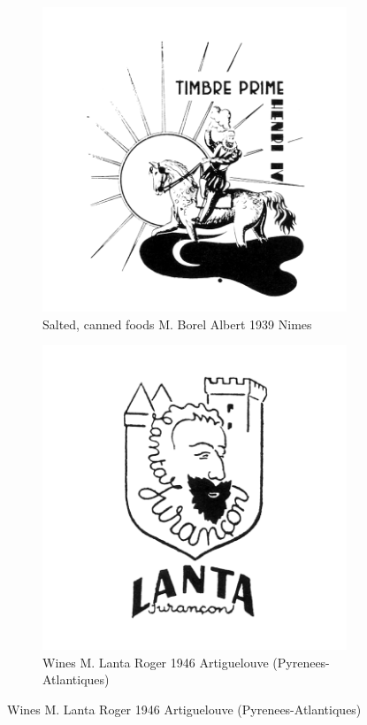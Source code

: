 \begin{figure}[h]
  \begin{subfigure}{.45\textwidth}
    \centering
    \includegraphics[width=.5\linewidth]{images/supplement/trademarks/french/6_8}
    \caption[]{Salted, canned foods M. Borel Albert 1939 Nimes}
    \label{fig:trademarks:french:6.8}
  \end{subfigure}\hfill
  \begin{subfigure}{.45\textwidth}
    \centering
    \includegraphics[width=.5\linewidth]{images/supplement/trademarks/french/6_9}
    \caption[]{Wines M. Lanta Roger 1946 Artiguelouve (Pyrenees-Atlantiques)}
    \label{fig:trademarks:french:6.9}
  \end{subfigure}


\end{figure}
